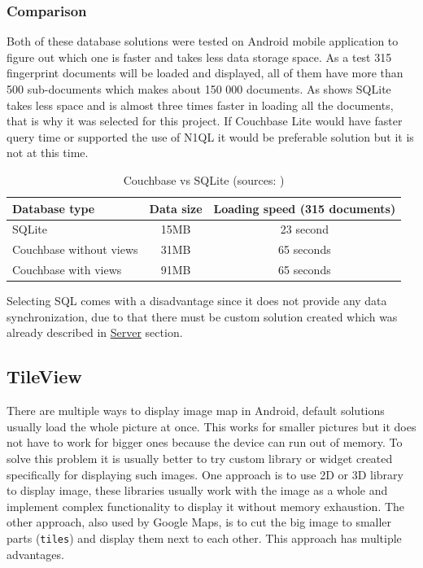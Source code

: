 \subsubsection{Comparison}\label{subsubsec:Comparison}
Both of these database solutions were tested on Android mobile application to figure out which one is faster and takes less data storage space. As a test 315 fingerprint documents will be loaded and displayed, all of them have more than 500 sub-documents which makes about 150 000 documents. As  shows SQLite takes less space and is almost three times faster in loading all the documents, that is why it was selected for this project. If Couchbase Lite would have faster query time or supported the use of N1QL it would be preferable solution but it is not at this time.

\begin{table}[h]
	\begin{center}
		\begin{tabular}{| l | c | c |}
			\hline
			Database type & Data size & Loading speed (315 documents) \\ \hline
			SQLite & 15MB & 23 second \\ \hline
			Couchbase without views & 31MB & 65 seconds \\ \hline
			Couchbase with views & 91MB & 65 seconds \\ \hline
		\end{tabular}
		\caption{Couchbase vs SQLite (sources: \cite{LGWSP, LGWST, HW2, PM600, AZW3})}
		\label{tab3}
	\end{center}
\end{table}

Selecting SQL comes with a disadvantage since it does not provide any data synchronization, due to that there must be custom solution created which was already described in \hyperref[sec:Server]{Server} section.

\subsection{TileView}\label{subsec:TileView}
There are multiple ways to display image map in Android, default solutions usually load the whole picture at once. This works for smaller pictures but it does not have to work for bigger ones because the device can run out of memory. To solve this problem it is usually better to try custom library or widget created specifically for displaying such images. One approach is to use 2D or 3D library to display image, these libraries usually work with the image as a whole and implement complex functionality to display it without memory exhaustion. The other approach, also used by Google Maps, is to cut the big image to smaller parts (\verb|tiles|) and display them next to each other. This approach has multiple advantages.

